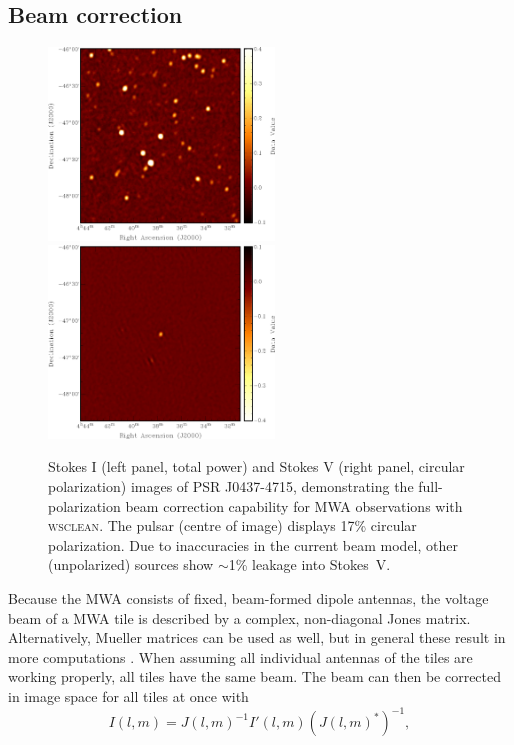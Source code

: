 \documentclass[useAMS,usenatbib]{mn2e}
\begin{document}
\subsection{Beam correction}
\begin{figure}
\begin{center}
\includegraphics[width=6cm]{img/pulsar-stokesi}\hspace{1cm}\includegraphics[width=6cm]{img/pulsar-stokesv}
\caption{Stokes I (left panel, total power) and Stokes V (right panel, circular polarization) images of PSR J0437-4715, demonstrating the full-polarization beam correction capability for MWA observations with \textsc{wsclean}. The pulsar (centre of image) displays 17\% circular polarization. Due to inaccuracies in the current beam model, other (unpolarized) sources show $\sim$1\% leakage into Stokes~V.}
\label{fig:pulsar-stokes-iv}
\end{center}
\end{figure}
Because the MWA consists of fixed, beam-formed dipole antennas, the voltage beam of a MWA tile is described by a complex, non-diagonal Jones matrix. Alternatively, Mueller matrices can be used as well, but in general these result in more computations \citep{revisiting-me-i}. When assuming all individual antennas of the tiles are working properly, all tiles have the same beam. The beam can then be corrected in image space for all tiles at once with
\begin{equation}\label{eq:beam-correction}
 I(l, m) = J(l,m)^{-1} I'(l, m) \left(J(l,m)^*\right)^{-1},
\end{equation}
\end{document}
